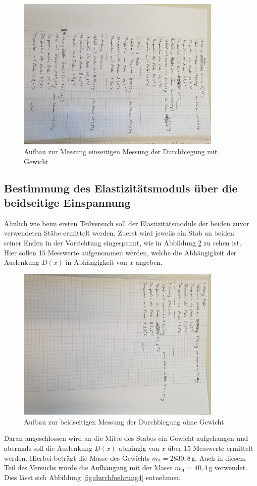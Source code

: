\begin{figure}[H]
    \centering
    \includegraphics[width=10cm]{2.jpg}
    \caption{Aufbau zur Messung einseitigen Messung der Durchbiegung mit Gewicht}
    \label{fig:durchfuehrung2}
\end{figure}
\noindent


\subsection{Bestimmung des Elastizitätsmoduls über die beidseitige Einspannung}

Ähnlich wie beim ersten Teilversuch soll der Elastizitätsmoduls der beiden zuvor verwendeten 
Stäbe ermittelt werden. Zuerst wird jeweils ein Stab an beiden seiner Enden in der Vorrichtung 
eingespannt, wie in Abbildung \ref{fig:durchfuehrung3} zu sehen ist.
Hier sollen 15 Messwerte aufgenommen werden, welche die Abhängigkeit der Auslenkung $D(x)$ in 
Abhängigkeit von $x$ angeben. 

\begin{figure}[H]
    \centering
    \includegraphics[width=10cm]{3.jpg}
    \caption{Aufbau zur beidseitigen Messung der Durchbiegung ohne Gewicht}
    \label{fig:durchfuehrung3}
\end{figure}
\noindent
Daran angeschlossen wird an die Mitte des Stabes ein Gewicht
aufgehangen und abermals soll die Auslenkung $D(x)$ abhängig von $x$ über 15 Messwerte
ermittelt werden. Hierbei beträgt die Masse des Gewichts $m_{2} = 2830,8\, \si{\gram}$. Auch in diesem 
Teil des Versuchs wurde die Aufhängung mit der Masse $m_{A} = 40,4\, \si{\gram}$ verwendet.
Dies lässt sich Abbildung \ref{fig:durchfuehrung4} entnehmen.

